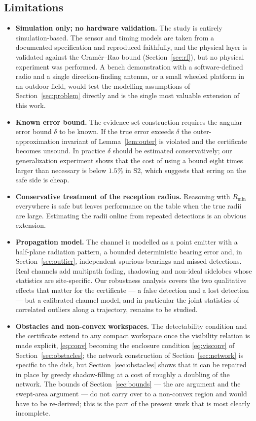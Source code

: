 \documentclass[journal,10pt]{IEEEtran}
\theoremstyle{definition}
\newcommand{\Rmin}{R_{\min}}
\begin{document}
\subsection{Limitations}
\begin{itemize}
\item \textbf{Simulation only; no hardware validation.} The study is entirely simulation-based.
The sensor and timing models are taken from a documented specification and reproduced faithfully,
and the physical layer is validated against the Cram\'er--Rao bound (Section~\ref{sec:rf}), but no
physical experiment was performed. A bench demonstration with a software-defined radio and a
single direction-finding antenna, or a small wheeled platform in an outdoor field, would test the
modelling assumptions of Section~\ref{sec:problem} directly and is the single most valuable
extension of this work.
\item \textbf{Known error bound.} The evidence-set construction requires the angular error bound
$\delta$ to be known. If the true error exceeds $\delta$ the outer-approximation invariant of
Lemma~\ref{lem:outer} is violated and the certificate becomes unsound. In practice $\delta$ should
be estimated conservatively; our generalization experiment shows that the cost of using a bound
eight times larger than necessary is below $1.5\%$ in S2, which suggests that erring on the safe
side is cheap.
\item \textbf{Conservative treatment of the reception radius.} Reasoning with $\Rmin$ everywhere
is safe but leaves performance on the table when the true radii are large. Estimating the radii
online from repeated detections is an obvious extension.
\item \textbf{Propagation model.} The channel is modelled as a point emitter with a half-plane
radiation pattern, a bounded deterministic bearing error and, in
Section~\ref{sec:outlier}, independent spurious bearings and missed detections. Real channels add
multipath fading, shadowing and non-ideal sidelobes whose statistics are site-specific. Our
robustness analysis covers the two qualitative effects that matter for the certificate --- a false
detection and a lost detection --- but a calibrated channel model, and in particular the joint
statistics of correlated outliers along a trajectory, remains to be studied.
\item \textbf{Obstacles and non-convex workspaces.} The detectability condition and the
certificate extend to any compact workspace once the visibility relation is made explicit,
\eqref{eq:conv} becoming the enclosure condition \eqref{eq:visconv} of
Section~\ref{sec:obstacles}; the network construction of Section~\ref{sec:network} is specific to
the disk, but Section~\ref{sec:obstacles} shows that it can be repaired in place by greedy
shadow-filling at a cost of roughly a doubling of the network. The bounds of
Section~\ref{sec:bounds} --- the arc argument and the swept-area argument --- do not carry over to
a non-convex region and would have to be re-derived; this is the part of the present work that is
most clearly incomplete.
\end{itemize}
\end{document}
